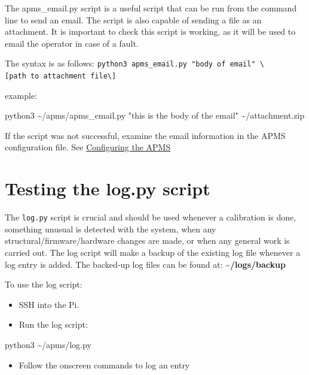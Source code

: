 \documentclass[
  letterpaper,
]{scrbook}
\newenvironment{Shaded}{\begin{snugshade}}{\end{snugshade}}
\newcommand{\ExtensionTok}[1]{\textcolor[rgb]{0.00,0.23,0.31}{#1}}
\newcommand{\NormalTok}[1]{\textcolor[rgb]{0.00,0.23,0.31}{#1}}
\newcommand{\StringTok}[1]{\textcolor[rgb]{0.13,0.47,0.30}{#1}}
\providecommand{\tightlist}{%
  \setlength{\itemsep}{0pt}\setlength{\parskip}{0pt}}
\begin{document}
The apms\_email.py script is a useful script that can be run from the
command line to send an email. The script is also capable of sending a
file as an attachment. It is important to check this script is working,
as it will be used to email the operator in case of a fault.

The syntax is as follows:
\texttt{python3\ apms\_email.py\ "body\ of\ email"\ \textbackslash{}{[}path\ to\ attachment\ file\textbackslash{}{]}}

example:

\begin{Shaded}
\begin{Highlighting}[]
\ExtensionTok{python3}\NormalTok{ \textasciitilde{}/apms/apms\_email.py }\StringTok{"this is the body of the email"}\NormalTok{ \textasciitilde{}/attachment.zip}
\end{Highlighting}
\end{Shaded}

If the script was not successful, examine the email information in the
APMS configuration file. See
\hyperref[Configuringux5cux2520theux5cux2520APMS]{Configuring the APMS}

\section{Testing the log.py script}\label{testing-the-log.py-script}

The \texttt{log.py} script is crucial and should be used whenever a
calibration is done, something unusual is detected with the system, when
any structural/firmware/hardware changes are made, or when any general
work is carried out. The log script will make a backup of the existing
log file whenever a log entry is added. The backed-up log files can be
found at: \textbf{\textasciitilde/logs/backup}

To use the log script:

\begin{itemize}
\item
  SSH into the Pi.
\item
  Run the log script:
\end{itemize}

\begin{Shaded}
\begin{Highlighting}[]
\ExtensionTok{python3}\NormalTok{ \textasciitilde{}/apms/log.py}
\end{Highlighting}
\end{Shaded}

\begin{itemize}
\tightlist
\item
  Follow the onscreen commands to log an entry
\end{itemize}
\end{document}
